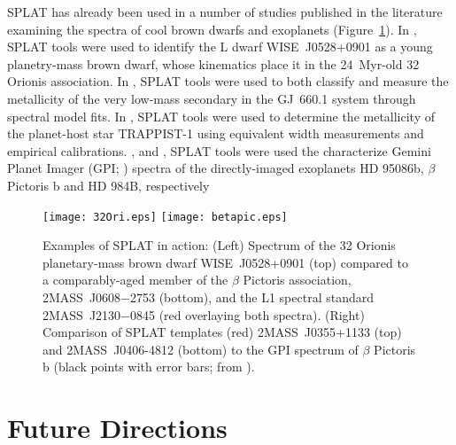 \documentclass[usenatbib]{basi}
\begin{document}
SPLAT has already been used in a number of studies published in the literature examining the spectra of cool brown dwarfs and exoplanets (Figure~\ref{fig:examples}).
In \citet{2016ApJ...820...32B}, SPLAT tools were used to identify the L dwarf WISE~J0528+0901 as a young planetry-mass brown dwarf, whose kinematics place it in the 24~Myr-old 32 Orionis association.
In \citet{2016AJ....151...46A}, SPLAT tools were used to both classify and measure the metallicity of the very low-mass secondary in the GJ~660.1 system through spectral model fits.
In \citet{2016Natur.533..221G}, SPLAT tools were used to determine the metallicity of the planet-host star TRAPPIST-1 using equivalent width measurements and empirical calibrations.
\citet{2016ApJ...824..121D,2017AJ....153..182C}, and \citet{2017AJ....153..190J}, SPLAT tools were used the characterize Gemini Planet Imager (GPI; \citealt{2014SPIE.9148E..0JM}) spectra of the directly-imaged exoplanets HD 95086b, $\beta$ Pictoris b and HD 984B, respectively

\begin{figure}[t]
  \centerline{  
  \texttt{[image: 32Ori.eps]}
  \texttt{[image: betapic.eps]}
  }
  \caption{Examples of SPLAT in action: 
  (Left) Spectrum of the 32 Orionis planetary-mass brown dwarf WISE~J0528+0901 (top) compared to a comparably-aged member of the $\beta$ Pictoris association, 2MASS~J0608$-$2753 (bottom), and the L1 spectral standard 2MASS~J2130$-$0845 (red overlaying both spectra).
  (Right) Comparison of SPLAT templates (red) 2MASS~J0355+1133 (top) and 2MASS~J0406-4812 (bottom) to the GPI spectrum of $\beta$ Pictoris b (black points with error bars; from \citealt{2017AJ....153..182C}).
  \label{fig:examples}}
  \end{figure}

\section{Future Directions}\label{s:future}
\end{document}
